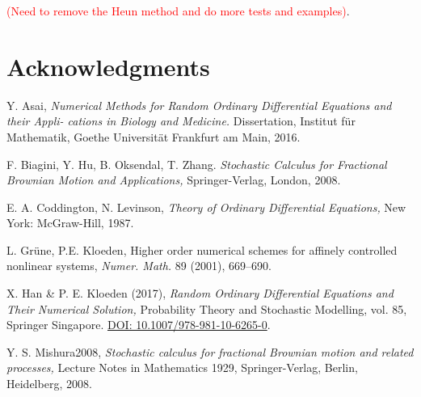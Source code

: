 \documentclass[reqno,12pt]{amsart}
\theoremstyle{plain}%
\theoremstyle{definition}
\begin{document}
\textcolor{red}{(Need to remove the Heun method and do more tests and examples)}.

\section*{Acknowledgments}

\begin{thebibliography}{25}
     Y. Asai, \emph{Numerical Methods for Random Ordinary Differential Equations and their Appli-
    cations in Biology and Medicine.} Dissertation, Institut für Mathematik, Goethe Universität Frankfurt am Main, 2016.

     F. Biagini, Y. Hu, B. Oksendal, T. Zhang. \emph{Stochastic Calculus for Fractional Brownian Motion and Applications,} Springer-Verlag, London, 2008.

     E. A. Coddington, N. Levinson, \emph{Theory of Ordinary Differential Equations,} New York: McGraw-Hill, 1987.

     L. Gr\"une, P.E. Kloeden, Higher order numerical schemes for affinely controlled nonlinear systems, \emph{Numer. Math.} 89 (2001), 669--690.

     X. Han \& P. E. Kloeden (2017), \emph{Random Ordinary Differential Equations and Their Numerical Solution,} Probability Theory and Stochastic Modelling, vol. 85, Springer Singapore. \href{https://link.springer.com/book/10.1007/978-981-10-6265-0}{DOI: 10.1007/978-981-10-6265-0}.

     Y. S. Mishura2008, \emph{Stochastic calculus for fractional Brownian motion and related processes,} Lecture Notes in Mathematics 1929, Springer-Verlag, Berlin, Heidelberg, 2008.

\end{thebibliography}
\end{document}
